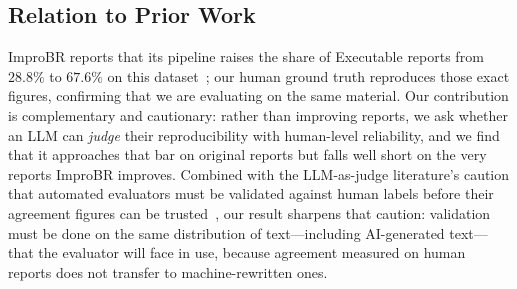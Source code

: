 \subsection{Relation to Prior Work}
\label{subsec:disc-related}

ImproBR reports that its pipeline raises the share of Executable reports from
$28.8\%$ to $67.6\%$ on this dataset~\cite{akyol2026improbr}; our human
ground truth reproduces those exact figures, confirming that we are evaluating
on the same material. Our contribution is complementary and cautionary: rather
than improving reports, we ask whether an LLM can \emph{judge} their
reproducibility with human-level reliability, and we find that it approaches
that bar on original reports but falls well short on the very reports ImproBR
improves. Combined with the LLM-as-judge literature's caution that automated
evaluators must be validated against human labels before their agreement figures
can be trusted~\cite{li2024judges}, our result sharpens that caution: validation
must be done on the same distribution of text---including AI-generated
text---that the evaluator will face in use, because agreement measured on human
reports does not transfer to machine-rewritten ones.
